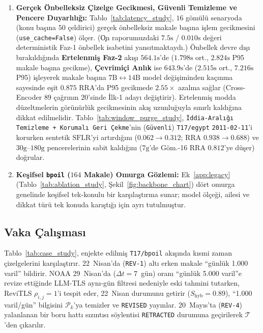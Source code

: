 ﻿\documentclass[journal]{IEEEtran}
\begin{document}
\begin{enumerate}
    \item \textbf{Ger\c{c}ek \"{O}nbelleksiz \c{C}izelge Gecikmesi, G\"{u}venli Temizleme ve Pencere Duyarl{\i}l{\i}\u{g}{\i}:} Tablo~\ref{tab:latency_study}, $16$ g\"{o}m\"{u}l\"{u} senaryoda (konu ba\c{s}{\i}na $50$ \c{c}eldirici) ger\c{c}ek \"{o}nbelleksiz makale ba\c{s}{\i}na i\c{s}lem gecikmesini (\texttt{use\_cache=False}) \"{o}l\c{c}er. (\c{O}n raporumuzdaki $7.5\text{s}$ / $0.010\text{s}$ de\u{g}eri deterministik Faz-1 \"{o}nbellek isabetini yans{\i}tmaktayd{\i}.) \"{O}nbellek devre d{\i}\c{s}{\i} b{\i}rak{\i}ld{\i}\u{g}{\i}nda \textbf{Ertelenmi\c{s} Faz-2} ak{\i}\c{s}{\i} $564.1\text{s}$'de ($1.798\text{s}$ ort., $2.824\text{s}$ P95 makale ba\c{s}{\i}na gecikme), \textbf{\c{C}evrimi\c{c}i Anl{\i}k} ise $643.9\text{s}$'de ($2.515\text{s}$ ort., $7.216\text{s}$ P95) i\c{s}leyerek makale ba\c{s}{\i}na $7\text{B}\leftrightarrow 14\text{B}$ model de\u{g}i\c{s}iminden ka\c{c}{\i}nma sayesinde e\c{s}it $0.875$ $\text{RRA}$'da P95 gecikmede $2.55\times$ azalma sa\u{g}lar (Cross-Encoder $89$ \c{c}a\u{g}r{\i}n{\i}n $20$'sinde \.{I}lk-1 aday{\i} de\u{g}i\c{s}tirir). Ertelenmi\c{s} modda d\"{u}zeltmelerin g\"{o}r\"{u}n\"{u}rl\"{u}k gecikmesinin ak{\i}\c{s} uzunlu\u{g}uyla s{\i}n{\i}rl{\i} kald{\i}\u{g}{\i}na dikkat edilmelidir. Tablo~\ref{tab:window_purge_study}, \texttt{\.{I}ddia-Aral{\i}\u{g}{\i} Temizleme + Korumal{\i} Geri \c{C}ekme}'nin (\texttt{G\"{u}venli}) \texttt{T17/egypt} \texttt{2011-02-11}'i korurken sentetik $\text{SFLR}$'yi art{\i}rd{\i}\u{g}{\i}n{\i} ($0.062 \to 0.312$; $\text{RRA}$ $0.938 \to 0.688$) ve $30\text{g}\text{--}180\text{g}$ pencerelerinin sabit kald{\i}\u{g}{\i}n{\i} ($7\text{g}$'de G\"{o}m.-16 $\text{RRA}$ $0.812$'ye d\"{u}\c{s}er) do\u{g}rular.
    \item \textbf{Ke\c{s}ifsel \texttt{bpoil} ($164$ Makale) Omurga G\"{o}zlemi:} Ek~\ref{app:legacy} (Tablo~\ref{tab:ablation_study}, \c{S}ekil~\ref{fig:backbone_chart}) d\"{o}rt omurga genelinde ke\c{s}ifsel tek-konulu bir kar\c{s}{\i}la\c{s}t{\i}rma sunar; model \"{o}l\c{c}e\u{g}i, ailesi ve dikkat t\"{u}r\"{u} tek konuda kar{\i}\c{s}t{\i}\u{g}{\i} i\c{c}in ayr{\i} tutulmu\c{s}tur.
\end{enumerate}

\subsection{Vaka \c{C}al{\i}\c{s}mas{\i}}
\label{subsec:case_study}

Tablo~\ref{tab:case_study}, enjekte edilmi\c{s} \texttt{T17/bpoil} ak{\i}\c{s}{\i}nda k{\i}smi zaman \c{c}izelgelerini kar\c{s}{\i}la\c{s}t{\i}r{\i}r. 22~Nisan'da (\texttt{REV-1}) alt{\i} erken makale ``g\"{u}nl\"{u}k 1.000 varil'' bildirir. NOAA 29~Nisan'da ($\Delta t = 7$~g\"{u}n) oran{\i} ``g\"{u}nl\"{u}k 5.000 varil''e revize etti\u{g}inde LLM-TLS ayn{\i}-g\"{u}n filtresi nedeniyle eski tahmini tutarken, ReviTLS $\rho_{i,j}=1$'i tespit eder, 22~Nisan durumunu getirir ($S_{\text{hyb}}=0.89$), ``1.000 varil/g\"{u}n'' bilgisini $\mathcal{P}_k$'ya temizler ve \texttt{REVISED} yay{\i}nlar. 20~May{\i}s'ta (\texttt{REV-4}) yalanlanan bir boru hatt{\i} s{\i}z{\i}nt{\i}s{\i} s\"{o}ylentisi \texttt{RETRACTED} durumuna ge\c{c}irilerek $\mathcal{T}$'den \c{c}{\i}kar{\i}l{\i}r.
\end{document}
